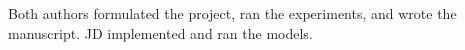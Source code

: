 \documentclass[OpenMind]{stjour}
\begin{document}
\authorcontributions 

Both authors formulated the project, ran the experiments, and wrote the manuscript. JD implemented and ran the models.






%


\end{document}
